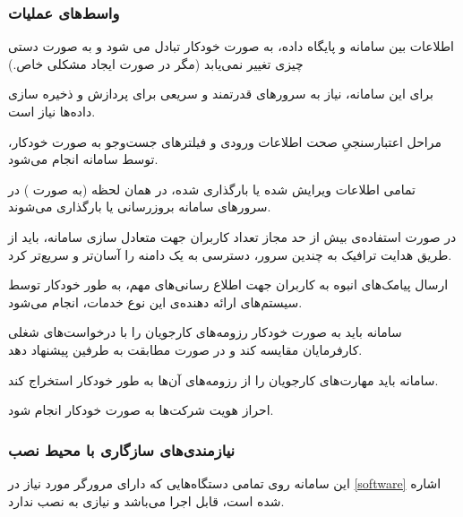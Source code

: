 \documentclass[12pt,svgnames,oneside]{book}
\newcounter{itemadded}
\let\LaTeXStandardEnumerateBegin\enumerate
\let\LaTeXStandardEnumerateEnd\endenumerate
\renewenvironment{enumerate}{%
	\LaTeXStandardEnumerateBegin%
	\setcounter{itemadded}{0}
}{%
	\LaTeXStandardEnumerateEnd%
}%
\begin{document}
				\subsubsection{واسط‌های عملیات}
					\begin{enumerate}
						\item
						اطلاعات بین سامانه و پایگاه داده، به صورت خودکار تبادل می شود و به صورت دستی چیزی تغییر نمی‌یابد (مگر در صورت ایجاد مشکلی خاص.)
						\item
						برای این سامانه، نیاز به سرورهای قدرتمند و سریعی برای پردازش و ذخیره سازی داده‌ها نیاز است.
						\item
						مراحل اعتبارسنجیِ صحت اطلاعات ورودی و فیلترهای جست‌و‌جو به صورت خودکار، توسط سامانه انجام می‌شود.
						\item
						تمامی اطلاعات ویرایش شده یا بارگذاری شده، در همان لحظه
						(به صورت  )
						 در سرور‌های سامانه بروزرسانی یا بارگذاری می‌شوند.
						\item
						در صورت استفاده‌ی بیش از حد مجاز تعداد کاربران جهت متعادل سازی سامانه، باید از طریق هدایت ترافیک به چندین سرور، دسترسی به یک دامنه را آسان‌تر و سریع‌تر کرد.
						\item
						ارسال پیامک‌های انبوه به کاربران جهت اطلاع رسانی‌های مهم، به طور خودکار توسط سیستم‌های ارائه دهنده‌ی این نوع خدمات، انجام می‌شود.
						\item
						سامانه باید به صورت خودکار رزومه‌های کارجویان را با درخواست‌های شغلی کارفرمایان مقایسه کند و در صورت مطابقت به طرفین پیشنهاد دهد.
						\item
						سامانه باید مهارت‌های کارجویان را از رزومه‌های آن‌ها به طور خودکار استخراج کند.
						\item
						احراز هویت شرکت‌ها به صورت خودکار انجام شود.
					\end{enumerate}
				\subsubsection{نیازمندی‌های سازگاری با محیط نصب}
					این سامانه روی تمامی دستگاه‌هایی که دارای مرورگر مورد نیاز در \ref{software} اشاره شده است، قابل اجرا می‌باشد و نیازی به نصب ندارد.
\end{document}
